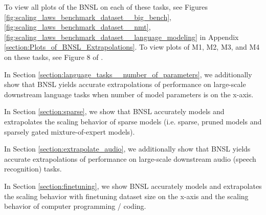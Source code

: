 \documentclass{article} %
\begin{document}



\vspace{-1.8mm}

To view all plots of the BNSL on each of these tasks, see Figures
\ref{fig:scaling_laws_benchmark_dataset__big_bench},
\ref{fig:scaling_laws_benchmark_dataset__nmt},
\ref{fig:scaling_laws_benchmark_dataset__language_modeling} in Appendix \ref{section:Plots_of_BNSL_Extrapolations}. To view plots of M1, M2, M3, and M4 on these tasks, see Figure 8 of \cite{Alabdulmohsi2022revisiting}.

In Section \ref{section:language_tasks__number_of_parameters}, we additionally show that BNSL yields accurate extrapolations of performance on large-scale downstream language tasks when number of model parameters is on the x-axis.

\vspace{-2.1mm}

In Section \ref{section:sparse}, we show that BNSL accurately models and extrapolates the scaling behavior of sparse models (i.e. sparse, pruned models and sparsely gated mixture-of-expert models).

\vspace{-2.1mm}

In Section \ref{section:extrapolate_audio}, we additionally show that BNSL yields accurate extrapolations of performance on large-scale downstream audio (speech recognition) tasks.

\vspace{-2.1mm}

In Section \ref{section:finetuning}, we show BNSL accurately models and extrapolates the scaling behavior with finetuning dataset size on the x-axis and the scaling behavior of computer programming / coding.

\vspace{-2.1mm}
\end{document}
